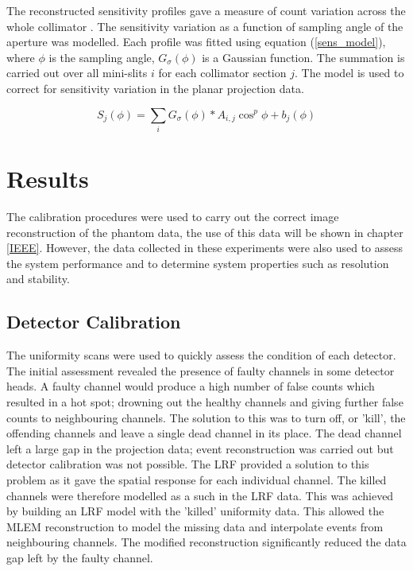The reconstructed sensitivity profiles gave a measure of count variation across the whole collimator \cite{Accorsi2008DerivationCollimation}. The sensitivity variation as a function of sampling angle of the aperture was modelled. Each profile was fitted using equation (\ref{sens_model}), where $\phi$ is the sampling angle, $G_{\sigma}(\phi)$ is a Gaussian function. The summation is carried out over all mini-slits $i$ for each collimator section $j$. The model is used to correct for sensitivity variation in the planar projection data. 

\begin{equation}
\label{sens_model}
S_{j}(\phi) = \sum_{i} G_{\sigma}(\phi) \ast A_{i,j} \cos^{p}{\phi} + b_{j}(\phi)
\end{equation}

\section{Results}
The calibration procedures were used to carry out the correct image reconstruction of the phantom data, the use of this data will be shown in chapter \ref{IEEE}. However, the data collected in these experiments were also used to assess the system performance and to determine system properties such as resolution and stability. 

\subsection{Detector Calibration}
 The uniformity scans were used to quickly assess the condition of each detector. The initial assessment revealed the presence of faulty channels in some detector heads. A faulty channel would produce a high number of false counts which resulted in a hot spot; drowning out the healthy channels and giving further false counts to neighbouring channels. The solution to this was to turn off, or 'kill', the offending channels and leave a single dead channel in its place. The dead channel left a large gap in the projection data; event reconstruction was carried out but detector calibration was not possible. The \acrshort{LRF} provided a solution to this problem as it gave the spatial response for each individual channel. The killed channels were therefore modelled as a such in the \acrshort{LRF} data. This was achieved by building an \acrshort{LRF} model with the 'killed' uniformity data. This allowed the \acrshort{MLEM} reconstruction to model the missing data and interpolate events from neighbouring channels. The modified reconstruction significantly reduced the data gap left by the faulty channel.
 
